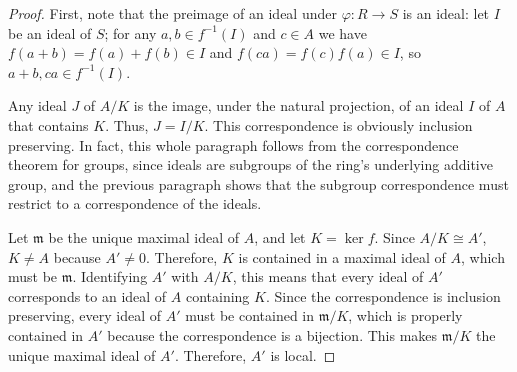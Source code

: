 \documentclass[10pt]{article}
\newcommand{\m}{\mathfrak{m}}
\begin{document}
\begin{enumerate}
\begin{proof}
First, note that the preimage of an ideal under $\varphi: R \rightarrow S$ is an ideal: let $I$ be an ideal of $S$; for any $a,b \in f^{-1}(I)$ and $c \in A$ we have $f(a+b) = f(a) + f(b) \in I$ and $f(ca) = f(c)f(a) \in I$, so $a+b, ca \in f^{-1}(I)$.

Any ideal $J$ of $A/K$ is the image, under the natural projection, of an ideal $I$ of $A$ that contains $K$.  Thus, $J = I/K$.  This correspondence is obviously inclusion preserving.  In fact, this whole paragraph follows from the correspondence theorem for groups, since ideals are subgroups of the ring's underlying additive group, and the previous paragraph shows that the subgroup correspondence must restrict to a correspondence of the ideals.

Let $\m$ be the unique maximal ideal of $A$, and let $K = \ker f$.  Since $A / K \cong A'$, $K \neq A$ because $A' \neq 0$.  Therefore, $K$ is contained in a maximal ideal of $A$, which must be $\m$.  Identifying $A'$ with $A / K$, this means that every ideal of $A'$ corresponds to an ideal of $A$ containing $K$.  Since the correspondence is inclusion preserving, every ideal of $A'$ must be contained in $\m / K$, which is properly contained in $A'$ because the correspondence is a bijection.  This makes $\m / K$ the unique maximal ideal of $A'$.  Therefore, $A'$ is local.
\end{proof}

\end{enumerate}
\end{document}

